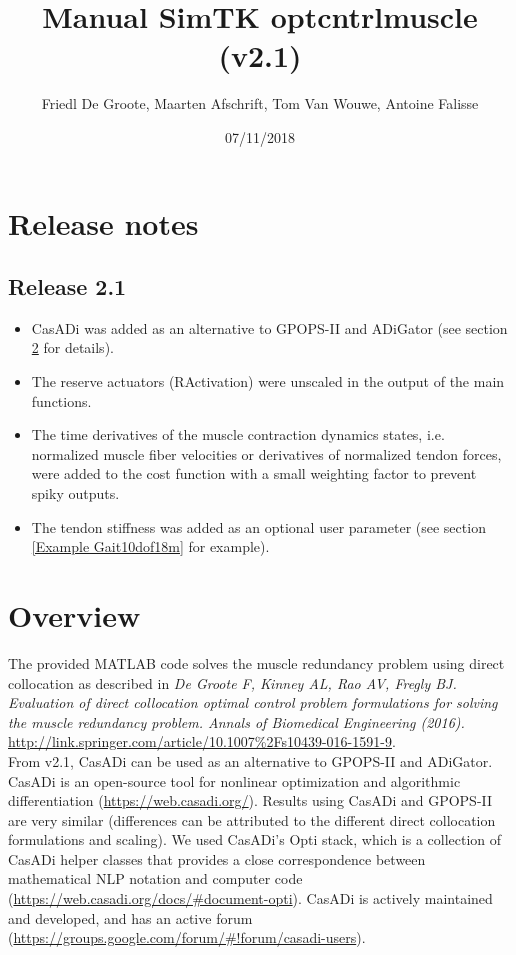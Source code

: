 \documentclass[a4paper,oneside,11pt]{article}
\begin{document}
\title{Manual SimTK optcntrlmuscle (v2.1)}
\author{Friedl De Groote, Maarten Afschrift, Tom Van Wouwe, Antoine Falisse}
\date{07/11/2018} 
\maketitle
\tableofcontents

\section{Release notes}

\subsection{Release 2.1}
\begin{itemize}
	\item CasADi was added as an alternative to GPOPS-II and ADiGator (see section \ref{Overview} for details).
	\item The reserve actuators (RActivation) were unscaled in the output of the main functions.
	\item The time derivatives of the muscle contraction dynamics states, i.e. normalized muscle fiber velocities or derivatives of normalized tendon forces, were added to the cost function with a small weighting factor to prevent spiky outputs.
	 \item The tendon stiffness was added as an optional user parameter (see section \ref{Example Gait10dof18m} for example).
\end{itemize}


\section{Overview}
\label{Overview}

The provided MATLAB code solves the muscle redundancy problem using direct collocation as described in \textit{De Groote F, Kinney AL, Rao AV, Fregly BJ. Evaluation of direct collocation optimal control problem formulations for solving the muscle redundancy problem. Annals of Biomedical Engineering (2016).} \url{http://link.springer.com/article/10.1007%2Fs10439-016-1591-9}. 
\\

From v2.1, CasADi can be used as an alternative to GPOPS-II and ADiGator. CasADi is an open-source tool for nonlinear optimization and algorithmic differentiation (\url{https://web.casadi.org/}). Results using CasADi and GPOPS-II are very similar (differences can be attributed to the different direct collocation formulations and scaling). We used CasADi's Opti stack, which is a collection of CasADi helper classes that provides a close correspondence between mathematical NLP notation and computer code (\url{https://web.casadi.org/docs/#document-opti}). CasADi is actively maintained and developed, and has an active forum (\url{https://groups.google.com/forum/#!forum/casadi-users}). \\
\end{document}
